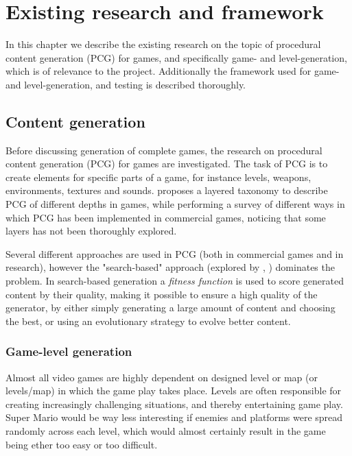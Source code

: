 \documentclass[a4paper,titlepage,final, twoside]{report}
\begin{document}
\chapter{Existing research and framework}
In this chapter we describe the existing research on the topic of procedural content generation (PCG) for games, and specifically game- and level-generation, which is of relevance to the project.
Additionally the framework used for game- and level-generation, and testing is described thoroughly.



\section{Content generation}

Before discussing generation of complete games, the research on procedural content generation (PCG) for games are investigated. 
The task of PCG is to create elements for specific parts of a game, for instance levels, weapons, environments, textures and sounds. 
\citet{hendrikx2013procedural} proposes a layered taxonomy to describe PCG of different depths in games, while performing a survey of different ways in which PCG has been implemented in commercial games, noticing that some layers has not been thoroughly explored.

Several different approaches are used in PCG (both in commercial games and in research), however the "search-based" approach (explored by \citet{togelius11search}, \citet{pcgbook:ch2}) dominates the problem.
In search-based generation a \textit{fitness function} is used to score generated content by their quality, making it possible to ensure a high quality of the generator, by either simply generating a large amount of content and choosing the best, or using an evolutionary strategy to evolve better content.




\subsection{Game-level generation}
Almost all video games are highly dependent on designed level or map (or levels/map) in which the game play takes place. Levels are often responsible for creating increasingly challenging situations, and thereby entertaining game play. Super Mario would be way less interesting if enemies and platforms were spread randomly across each level, which would almost certainly result in the game being ether too easy or too difficult.
\end{document}
